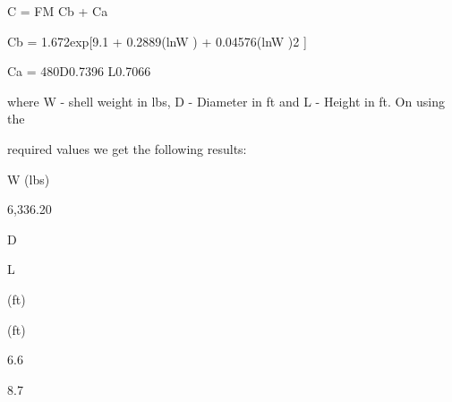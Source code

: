 \documentclass[a4paper,portrait,12pt]{article}
\begin{document}
\begin{flushleft}
C = FM Cb + Ca
\end{flushleft}


\begin{flushleft}
Cb = 1.672exp[9.1 + 0.2889(lnW ) + 0.04576(lnW )2 ]
\end{flushleft}


\begin{flushleft}
Ca = 480D0.7396 L0.7066
\end{flushleft}


\begin{flushleft}
where W - shell weight in lbs, D - Diameter in ft and L - Height in ft. On using the
\end{flushleft}


\begin{flushleft}
required values we get the following results:
\end{flushleft}





\begin{flushleft}
W (lbs)
\end{flushleft}


6,336.20





\begin{flushleft}
D
\end{flushleft}





\begin{flushleft}
L
\end{flushleft}





\begin{flushleft}
(ft)
\end{flushleft}





\begin{flushleft}
(ft)
\end{flushleft}





6.6





8.7
\end{document}
